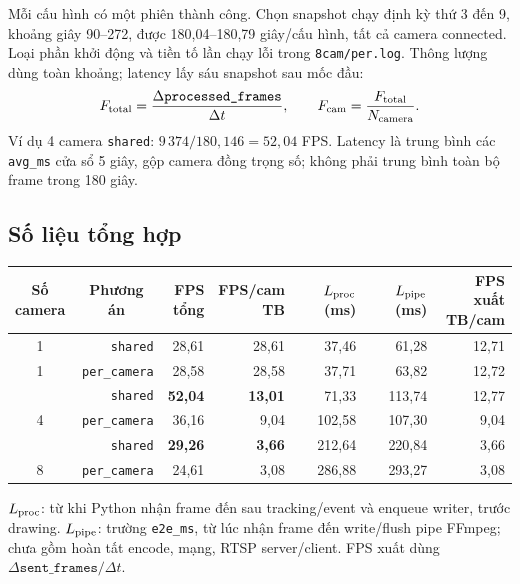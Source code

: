 \documentclass[10pt,a4paper]{article}
\newcommand{\shared}{\texttt{shared}}
\newcommand{\percam}{\texttt{per\_camera}}
\begin{document}
Mỗi cấu hình có một phiên thành công. Chọn snapshot chạy định kỳ thứ 3 đến 9,
khoảng giây 90--272, được 180,04--180,79 giây/cấu hình, tất cả camera connected.
Loại phần khởi động và tiền tố lần chạy lỗi trong \texttt{8cam/per.log}.
Thông lượng dùng toàn khoảng; latency lấy sáu snapshot sau mốc đầu:
\[
 F_{\rm total}=\frac{\Delta\texttt{processed\_frames}}{\Delta t},
 \qquad F_{\rm cam}=\frac{F_{\rm total}}{N_{\rm camera}}.
\]
\vspace{-8pt}
Ví dụ 4 camera \shared{}: $9\,374/180{,}146=52{,}04$ FPS.
Latency là trung bình các \texttt{avg\_ms} cửa sổ 5 giây, gộp camera đồng trọng
số; không phải trung bình toàn bộ frame trong 180 giây.

\subsection*{Số liệu tổng hợp}
\begin{center}
\small
\setlength{\tabcolsep}{7pt}
\begin{tabular}{@{}crrrrrr@{}}
\toprule
\shortstack{Số\\camera} & \multicolumn{1}{c}{Phương án} &
\shortstack{FPS\\tổng} & \shortstack{FPS/cam\\TB} &
\shortstack{$L_{\rm proc}$\\(ms)} &
\shortstack{$L_{\rm pipe}$\\(ms)} & \shortstack{FPS xuất\\TB/cam}\\
\midrule
1 & \shared & 28,61 & 28,61 & 37,46 & 61,28 & 12,71\\
1 & \percam & 28,58 & 28,58 & 37,71 & 63,82 & 12,72\\
\addlinespace
4 & \shared & \textbf{52,04} & \textbf{13,01} & 71,33 & 113,74 & 12,77\\
4 & \percam & 36,16 & 9,04 & 102,58 & 107,30 & 9,04\\
\addlinespace
8 & \shared & \textbf{29,26} & \textbf{3,66} & 212,64 & 220,84 & 3,66\\
8 & \percam & 24,61 & 3,08 & 286,88 & 293,27 & 3,08\\
\bottomrule
\end{tabular}
\end{center}

$L_{\rm proc}$: từ khi Python nhận frame đến sau tracking/event và enqueue
writer, trước drawing. $L_{\rm pipe}$: trường \texttt{e2e\_ms}, từ lúc nhận frame
đến write/flush pipe FFmpeg; chưa gồm hoàn tất encode, mạng, RTSP server/client.
FPS xuất dùng $\Delta\texttt{sent\_frames}/\Delta t$.
\end{document}
